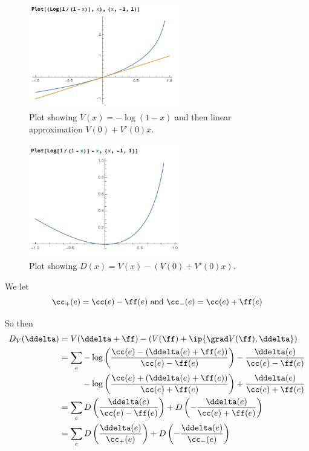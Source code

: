 \begin{figure}[H]
  \centering
    \includegraphics[width=0.6\textwidth]{fig/logbarrier.png} %
    \caption{Plot showing ${V(x) = -\log(1-x)}$ and then linear
      approximation ${V(0) + V'(0) x}$.}
\end{figure}


\begin{figure}[H]
  \centering
    \includegraphics[width=0.6\textwidth]{fig/logdivergence.png}%
    \caption{Plot showing ${D(x) = V(x) - (V(0) + V'(0) x)}$.}
\end{figure}

  
We let
\[
  \cc_+(e) = \cc(e) - \ff(e) \text{ and } \cc_-(e) = \cc(e) + \ff(e)
\]

So then  
\begin{align*}
  D_V( \ddelta )
  &=
  V(\ddelta+\ff)
  -
  (V(\ff)
  +
  \ip{\grad V(\ff), \ddelta})
  \\
  &=
  \sum_e
  -\log
  \left(\frac{\cc(e)-(\ddelta(e)+\ff(e))}
  {\cc(e)-\ff(e)} 
    \right)
   -
\frac{\ddelta(e)}
  {\cc(e)-\ff(e)} 
  \\
  &\quad\quad\,\,\,\,
  -\log
\left(
  \frac{\cc(e)+(\ddelta(e)+\ff(e))}
  {\cc(e)+\ff(e)} 
  \right)
   +
\frac{\ddelta(e)}
    {\cc(e)+\ff(e)}
  \\
  &=
    \sum_e
    D\left(\frac{\ddelta(e)}
    {\cc(e)-\ff(e)}
    \right)
    +
     D\left(-\frac{\ddelta(e)}
    {\cc(e)+\ff(e)}
    \right)
   \\
  &=
    \sum_e
    D\left(\frac{\ddelta(e)}{\cc_+(e)}\right)
    +
    D\left(-\frac{\ddelta(e)}{\cc_-(e)}\right)
\end{align*}

